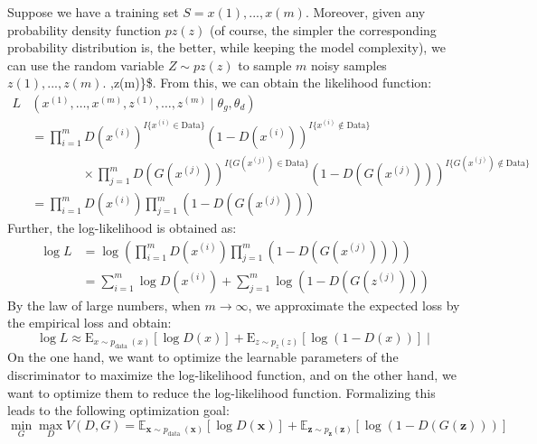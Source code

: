\documentclass[
]{article}
\begin{document}
Suppose we have a training set \(S={x(1),... ,x(m)}\). Moreover, given
any probability density function \(pz(z)\) (of course, the simpler the
corresponding probability distribution is, the better, while keeping the
model complexity), we can use the random variable \(Z∼pz(z)\) to sample
\(m\) noisy samples \({z(1),...,z(m)}\). ,z(m)\}\$. From this, we can
obtain the likelihood function:
$$
\begin{aligned}
L&(x^{(1)}, \ldots, x^{(m)}, z^{(1)}, \ldots, z^{(m)} \mid \theta_{g}, \theta_{d}) \\
&= \prod_{i=1}^{m} D(x^{(i)})^{I\{x^{(i)} \in \text{Data}\}}(1-D(x^{(i)}))^{I\{x^{(i)} \notin \text{Data}\}} \\
&\qquad\qquad\times \prod_{j=1}^{m} D(G(x^{(j)}))^{I\{G(x^{(j)}) \in \text{Data}\}}(1-D(G(x^{(j)})))^{I\{G(x^{(j)}) \notin \text{Data}\}} \\
&= \prod_{i=1}^{m} D(x^{(i)}) \prod_{j=1}^{m} (1-D(G(x^{(j)})))
\end{aligned}
$$
Further, the log-likelihood is obtained as:
$$
\begin{aligned}
\log L &= \log \left(\prod_{i=1}^{m} D\left(x^{(i)}\right) \prod_{j=1}^{m}\left(1-D\left(G\left(x^{(j)}\right)\right)\right)\right) \\
&= \sum_{i=1}^{m} \log D\left(x^{(i)}\right)+\sum_{j=1}^{m} \log \left(1-D\left(G\left(z^{(j)}\right)\right)\right)
\end{aligned}
$$
By the law of large numbers, when \(m → ∞\), we approximate the expected
loss by the empirical loss and obtain:
$$
\log L \approx \mathrm{E}_{x \sim p_{\text {data }}(x)}[\log D(x)]+\mathrm{E}_{z \sim p_z(z)}[\log (1-D(x))] \mid
$$
On the one hand, we want to optimize the learnable parameters of the
discriminator to maximize the log-likelihood function, and on the other
hand, we want to optimize them to reduce the log-likelihood function.
Formalizing this leads to the following optimization goal:
$$
\min _G \max _D V(D, G)=\mathbb{E}_{\boldsymbol{x} \sim p_{\text {data }}(\boldsymbol{x})}[\log D(\boldsymbol{x})]+\mathbb{E}_{\boldsymbol{z} \sim p_{\boldsymbol{z}}(\boldsymbol{z})}[\log (1-D(G(\boldsymbol{z})))]
$$
\end{document}
